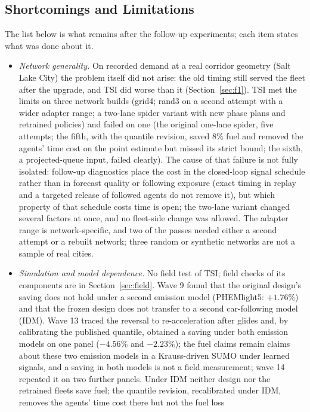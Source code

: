 \subsection{Shortcomings and Limitations}
The list below is what remains after the follow-up experiments; each item states what was done about it.
\begin{itemize}\setlength\itemsep{1pt}
\item \emph{Network generality.} On recorded demand at a real corridor geometry (Salt Lake City) the problem itself did not arise: the old
timing still served the fleet after the upgrade, and TSI did worse than it (Section~\ref{sec:f1}). TSI met the limits on three network builds (grid4; rand3 on a second attempt with a wider adapter range;
a two-lane spider variant with new phase plans and retrained policies) and failed on one (the original one-lane spider, five attempts;
the fifth, with the quantile revision, saved $8\%$ fuel and removed the agents' time cost on the point estimate but missed its strict bound;
the sixth, a projected-queue input, failed clearly).
The cause of that failure is not fully isolated: follow-up diagnostics place the cost in the closed-loop signal schedule rather than in
forecast quality or following exposure (exact timing in replay and a targeted release of followed agents do not remove it), but which
property of that schedule costs time is open; the two-lane variant changed several factors at once, and no fleet-side change was allowed. The
adapter range is network-specific, and two of the passes needed either a second attempt or a rebuilt network; three random or synthetic
networks are not a sample of real cities.
\item \emph{Simulation and model dependence.} No field test of TSI; field checks of its components are in Section~\ref{sec:field}. Wave 9 found that the original design's saving does not hold under a second
emission model (PHEMlight5: $+1.76\%$) and that the frozen design does not transfer to a second car-following model (IDM). Wave 13 traced
the reversal to re-acceleration after glides and, by calibrating the published quantile, obtained a saving under both emission models on
one panel ($-4.56\%$ and $-2.23\%$); the fuel claims remain claims about these two emission models in a Krauss-driven SUMO under learned
signals, and a saving in both models is not a field measurement; wave 14 repeated it on two further panels. Under IDM neither design nor
the retrained fleets save fuel; the quantile revision, recalibrated under IDM, removes the agents' time cost there but not the fuel loss

\end{itemize}
